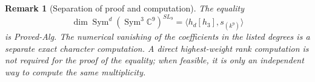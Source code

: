 \documentclass[11pt]{article}
\newtheorem{remark}{Remark}
\newcommand{\C}{\mathbb C}
\newcommand{\Sym}{\operatorname{Sym}}
\begin{document}
\begin{remark}[Separation of proof and computation]
The equality
\[
    \dim \Sym^d(\Sym^3\C^9)^{SL_9}
    =
    \big\langle h_d[h_3],s_{(k^9)}\big\rangle
\]
is Proved-Alg. The numerical vanishing of the coefficients in the listed
degrees is a separate exact character computation. A direct highest-weight rank
computation is not required for the proof of the equality; when feasible, it is
only an independent way to compute the same multiplicity.
\end{remark}
\end{document}
